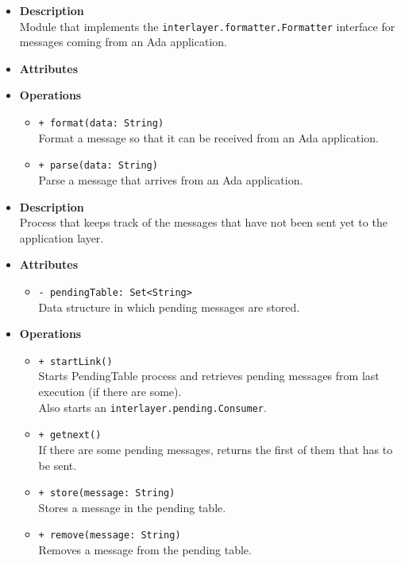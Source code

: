 \FloatBarrier
\begin{itemize}
  \item \textbf{Description} \\
    Module that implements the \texttt{interlayer.formatter.Formatter}
    interface for messages coming from an Ada application.
  \item \textbf{Attributes}
  \item \textbf{Operations}
  \begin{itemize}
    \item \texttt{+ format(data: String)} \\
    Format a message so that it can be received from an Ada application.
    \item \texttt{+ parse(data: String)} \\
    Parse a message that arrives from an Ada application.
  \end{itemize}
\end{itemize}

\FloatBarrier
\begin{itemize}
  \item \textbf{Description} \\
    Process that keeps track of the messages that have not been sent yet to
    the application layer.
  \item \textbf{Attributes}
    \begin{itemize}
      \item \texttt{- pendingTable: Set<String>} \\
    Data structure in which pending messages are stored.
    \end{itemize}
  \item \textbf{Operations}
  \begin{itemize}
    \item \texttt{+ startLink()} \\
    Starts PendingTable process and retrieves pending messages from last
    execution (if there are some). \\
    Also starts an \texttt{interlayer.pending.Consumer}.
    \item \texttt{+ getnext()} \\
    If there are some pending messages, returns the first of them that has to
    be sent.
    \item \texttt{+ store(message: String)} \\
    Stores a message in the pending table.
    \item \texttt{+ remove(message: String)} \\
    Removes a message from the pending table.
  \end{itemize}
\end{itemize}

